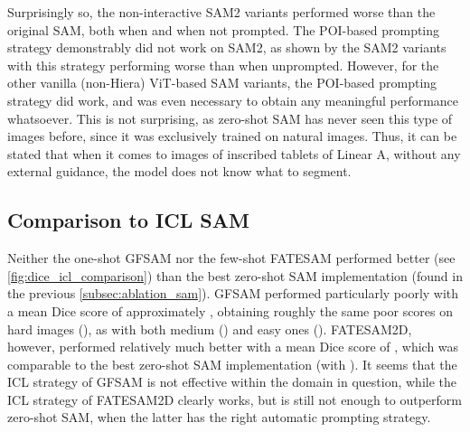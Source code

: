 \begin{table}[htp]
\centering
\renewcommand{\arraystretch}{1.25}
\caption{Mean \acs{Dice} scores of the in total 12 tested permutations of Mobile\acs{SAM} (M), \acs{SAM} (S), and \acs{SAM}2 (S2), with and without automatic classical threshold-derived point prompts, and with and without bilateral filter.}
\vspace{0.5em}

\label{tab:sam-variants-summary}
\end{table}

Surprisingly so, the non-interactive \acs{SAM}2 variants performed worse than the original \acs{SAM}, both when and when not prompted.
The \acs{POI}-based prompting strategy demonstrably did not work on \acs{SAM}2, as shown by the \acs{SAM}2 variants with this strategy performing worse than when unprompted.
However, for the other vanilla (non-Hiera) \acs{ViT}-based \acs{SAM} variants, the \acs{POI}-based prompting strategy did work, and was even necessary to obtain any meaningful performance whatsoever.
This is not surprising, as zero-shot \acs{SAM} has never seen this type of images before, since it was exclusively trained on natural images.
Thus, it can be stated that when it comes to images of inscribed tablets of Linear A, without any external guidance, the model does not know what to segment.

\subsection{Comparison to \acs{ICL} \acs{SAM}}
\label{subsec:comparison_icl_sam}
Neither the one-shot \acs{GFSAM} nor the few-shot \acs{FATESAM} performed better (see \cref{fig:dice_icl_comparison}) than the best zero-shot \acs{SAM} implementation (found in the previous \cref{subsec:ablation_sam}). 
\acs{GFSAM} performed particularly poorly with a mean \acs{Dice} score of approximately , obtaining roughly the same poor scores on hard images (), as with both medium () and easy ones (). 
\acs{FATESAM}2D, however, performed relatively much better with a mean \acs{Dice} score of , which was comparable to the best zero-shot \acs{SAM} implementation (with ).
It seems that the \acs{ICL} strategy of \acs{GFSAM} is not effective within the domain in question, while the \acs{ICL} strategy of \acs{FATESAM}2D clearly works, but is still not enough to outperform zero-shot \acs{SAM}, when the latter has the right automatic prompting strategy.

